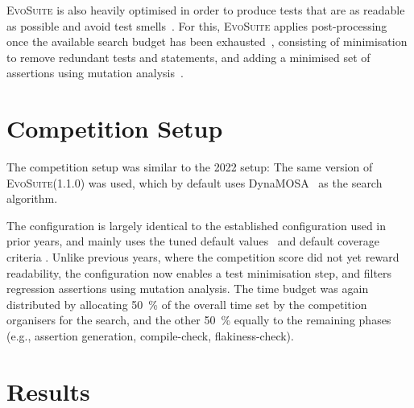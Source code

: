 \documentclass[10pt,conference]{IEEEtran}
\newcommand{\EVOSUITE}{\textsc{EvoSuite}\xspace}
\begin{document}
\EVOSUITE is also heavily optimised in order to produce tests that are as
readable as possible and avoid test smells~\cite{panichella2020revisiting}.
For this, \EVOSUITE applies post-processing once the available search budget
has been exhausted~\cite{FrA11c,FrA13a}, consisting of minimisation to
remove redundant tests and statements, and adding a minimised set of assertions
using mutation analysis~\cite{10.1109/TSE.2011.93}.


\section{Competition Setup}\label{sec:setup}

The competition setup was similar to the 2022 setup: The same version of
\EVOSUITE (1.1.0) was used, which by default uses DynaMOSA~\cite{dynamosa} as
the search algorithm.

The configuration is largely identical to the established configuration used in
prior years, and mainly uses the tuned default
values~\cite{arcuri2013parameter} and default coverage criteria
\cite{rojas2015combining}.
%
Unlike previous years, where the competition score did not yet reward readability,
the configuration now enables a test minimisation step, and filters regression
assertions using mutation analysis.
%
The time budget was again distributed by allocating \SI{50}{\percent} of the overall time
set by the competition organisers for the search, and the other \SI{50}{\percent} equally to
the remaining phases (e.g., assertion generation, compile-check, flakiness-check).



\section{Results}

\end{document}
